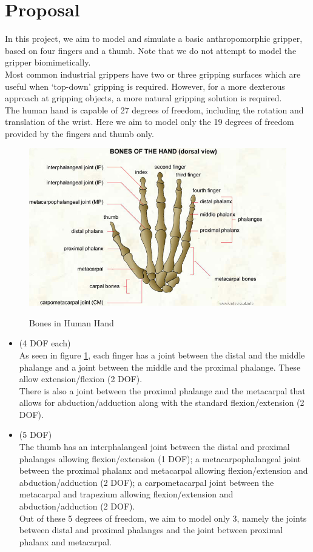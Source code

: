 \documentclass[12pt]{article}
\begin{document}
\section*{Proposal}
In this project, we aim to model and simulate a basic anthropomorphic gripper, based on four fingers and a thumb. Note that we do not attempt to model the gripper biomimetically.\\
Most common industrial grippers have two or three gripping surfaces which are useful when `top-down' gripping is required. However, for a more dexterous approach at gripping objects, a more natural gripping solution is required.\\
The human hand is capable of 27 degrees of freedom, including the rotation and translation of the wrist.\cite{dof} Here we aim to model only the 19 degrees of freedom provided by the fingers and thumb only.\\
\newline
\begin{figure}[h!]
\caption{Bones in Human Hand}
\includegraphics[scale=1.5]{img/finger_names.jpg}
\label{fig:bones}
\centering
\end{figure}
\begin{itemize}
\item {} (4 DOF each)\\
As seen in figure \ref{fig:bones}, each finger has a joint between the distal and the middle phalange and a joint between the middle and the proximal phalange. These allow extension/flexion (2 DOF).\\
There is also a joint between the proximal phalange and the metacarpal that allows for abduction/adduction along with the standard flexion/extension (2 DOF).

\item {} (5 DOF)\\
The thumb has an interphalangeal joint between the distal and proximal phalanges allowing flexion/extension (1 DOF); a metacarpophalangeal joint between the proximal phalanx and metacarpal allowing flexion/extension and abduction/adduction (2 DOF); a carpometacarpal joint between the metacarpal and trapezium allowing flexion/extension and abduction/adduction (2 DOF).\\
Out of these 5 degrees of freedom, we aim to model only 3, namely the joints between distal and proximal phalanges and the joint between proximal phalanx and metacarpal.
\end{itemize}
\end{document}
